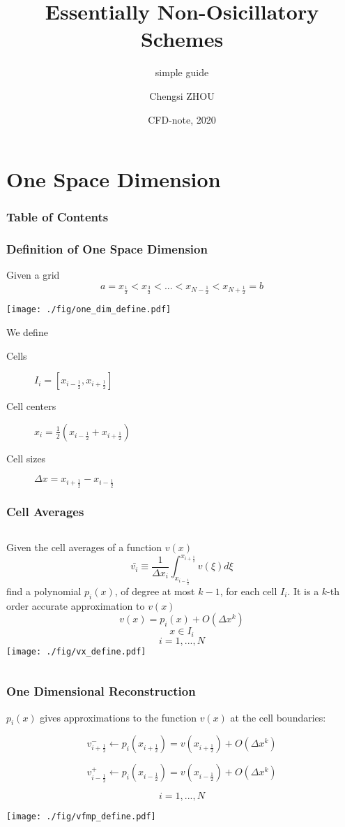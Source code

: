 \documentclass[MathSerif,aspectratio=169]{beamer}
\title[CFD-note] %
{Essentially Non-Osicillatory Schemes}
\subtitle{simple guide}
\author[Chengsi ZHOU] %
{Chengsi ZHOU}
\date[Feb 2020] %
{CFD-note, 2020}
\begin{document}
\section[Definition]{One Space Dimension}
\begin{frame}
	\frametitle{Table of Contents}
	\tableofcontents[]
\end{frame}

\begin{frame}
    \frametitle{Definition of One Space Dimension}
	Given a grid 
	\[ a = x_{\frac{1}{2}} < x_{\frac{3}{2}} < ... < x_{N-\frac{1}{2}} < x_{N + \frac{1}{2}} = b \]
\begin{center}
	\texttt{[image: ./fig/one\_dim\_define.pdf]}
\end{center}
	We define 
\begin{description}
	\item[Cells] \( I_i = [x_{i-\frac{1}{2}}, x_{i+\frac{1}{2}}]\)
	\item[Cell centers] \( x_i = \frac{1}{2} (x_{i-\frac{1}{2}} + x_{i+\frac{1}{2}})\)
	\item[Cell sizes] \( \Delta x = x_{i+\frac{1}{2}} - x_{i-\frac{1}{2}}\)
\end{description}
\end{frame}

\begin{frame}

\frametitle{Cell Averages}

\begin{columns}[T] %
    Given the cell averages of a function \( v(x) \) 
    \[ \bar{v_i} \equiv \frac{1}{\Delta x_i}  \int_{x_{i-\frac{1}{2}}}^{x_{i+\frac{1}{2}}} v(\xi) d \xi\]
    find a polynomial $p_i(x)$, of degree at most $k-1$, for each cell $I_i$. It is a $k$-th order accurate approximation to $v(x)$
    \[v(x) = p_i(x) + O(\Delta x^k)\]
    \[x \in I_i\]
    \[i=1,...,N\]
    \texttt{[image: ./fig/vx\_define.pdf]}
    \end{columns}

\end{frame}


\begin{frame}

\frametitle{One Dimensional Reconstruction}

$p_i(x)$ gives approximations to the function $v(x)$ at the cell boundaries:

\[ v^{-}_{i+\frac{1}{2}} \leftarrow p_i(x_{i+\frac{1}{2}}) = v(x_{i+\frac{1}{2}}) + O(\Delta x^k)\]

\[ v^{+}_{i-\frac{1}{2}} \leftarrow p_i(x_{i-\frac{1}{2}}) = v(x_{i-\frac{1}{2}}) + O(\Delta x^k)\]

\[ i = 1, ..., N\]
\begin{center}
\texttt{[image: ./fig/vfmp\_define.pdf]}
\end{center}

\end{frame}
  
\end{document}

